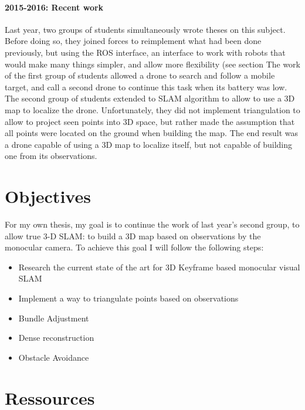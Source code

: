 \paragraph{2015-2016: Recent work}
Last year, two groups of students simultaneously wrote theses on this subject. Before doing so, they joined forces to reimplement what had been done previously, but using the ROS interface, an interface to work with robots that would make many things simpler, and allow more flexibility (see section %
The work of the first group of students allowed a drone to search and follow a mobile target, and call a second drone to continue this task when its battery was low.\\
The second group of students extended to SLAM algorithm to allow to use a 3D map to localize the drone. Unfortunately, they did not implement triangulation to allow to project seen points into 3D space, but rather made the assumption that all points were located on the ground when building the map. The end result was a drone capable of using a 3D map to localize itself, but not capable of building one from its observations.


\section{Objectives}
For my own thesis, my goal is to continue the work of last year's second group, to allow true 3-D SLAM: to build a 3D map based on observations by the monocular camera. To achieve this goal I will follow the following steps:
\begin{itemize}
\item Research the current state of the art for 3D Keyframe based monocular visual SLAM
\item Implement a way to triangulate points based on observations
\item Bundle Adjustment
\item Dense reconstruction
\item Obstacle Avoidance
\end{itemize}

\section{Ressources}


